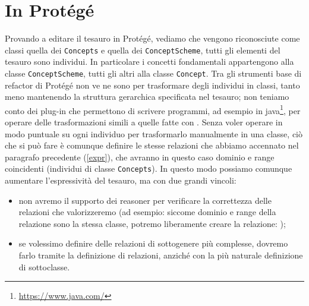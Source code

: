 \section{In Protégé}
Provando a editare il tesauro in Protégé, vediamo che vengono riconosciute come classi quella dei \verb|Concepts| e quella dei \verb|ConceptScheme|, tutti gli elementi del tesauro sono individui. In particolare i concetti fondamentali appartengono alla classe \verb|ConceptScheme|, tutti gli altri alla classe \verb|Concept|. Tra gli strumenti base di refactor di Protégé non ve ne sono per trasformare degli individui in classi, tanto meno mantenendo la struttura gerarchica specificata nel tesauro; non teniamo conto dei plug-in che permettono di scrivere programmi, ad esempio in java\footnote{\url{https://www.java.com/}}, per operare delle trasformazioni simili a quelle fatte con \cduce. Senza voler operare in modo puntuale su ogni individuo per trasformarlo manualmente in una classe, ciò che si può fare è comunque definire le stesse relazioni che abbiamo accennato nel paragrafo precedente (\ref{expr}), che avranno in questo caso dominio e range coincidenti (individui di classe \verb|Concepts|). In questo modo possiamo comunque aumentare l'espressività del tesauro, ma con due grandi vincoli:
\begin{itemize}
	\item non avremo il supporto dei reasoner per verificare la correttezza delle relazioni che valorizzeremo (ad esempio: siccome dominio e range della relazione  sono la stessa classe, potremo liberamente creare la relazione: );
	\item se volessimo definire delle relazioni di sottogenere più complesse, dovremo farlo tramite la definizione di relazioni, anziché con la più naturale definizione di sottoclasse.
\end{itemize}
